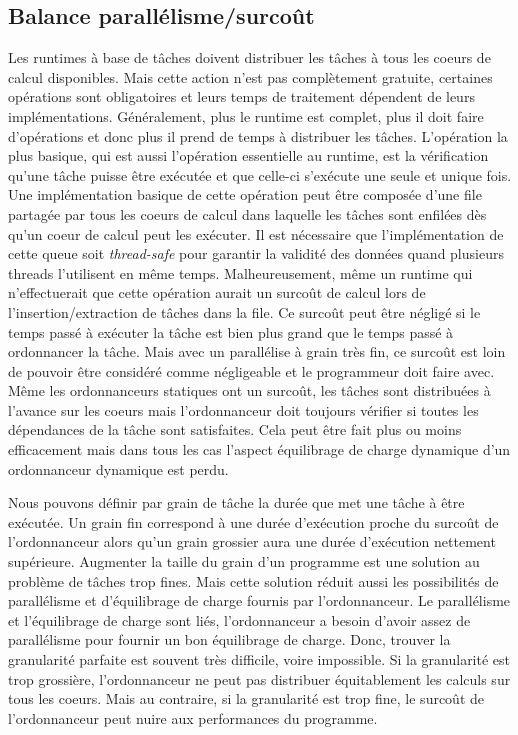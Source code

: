 \subsection{Balance parallélisme/surcoût}
Les runtimes à base de tâches doivent distribuer les tâches à tous les coeurs de calcul disponibles.
%
Mais cette action n'est pas complètement gratuite, certaines opérations sont obligatoires et leurs temps de traitement dépendent de leurs implémentations.
%
Généralement, plus le runtime est complet, plus il doit faire d'opérations et donc plus il prend de temps à distribuer les tâches.
%
L'opération la plus basique, qui est aussi l'opération essentielle au runtime, est la vérification qu'une tâche puisse être exécutée et que celle-ci s'exécute une seule et unique fois.
%
Une implémentation basique de cette opération peut être composée d'une file partagée par tous les coeurs de calcul dans laquelle les tâches sont enfilées dès qu'un coeur de calcul peut les exécuter.
%
Il est nécessaire que l'implémentation de cette queue soit {\em thread-safe} pour garantir la validité des données quand plusieurs threads l'utilisent en même temps.
%
Malheureusement, même un runtime qui n'effectuerait que cette opération aurait un surcoût de calcul lors de l'insertion/extraction de tâches dans la file.
%
Ce surcoût peut être négligé si le temps passé à exécuter la tâche est bien plus grand que le temps passé à ordonnancer la tâche.
%
Mais avec un parallélise à grain très fin, ce surcoût est loin de pouvoir être considéré comme négligeable et le programmeur doit faire avec.
%
Même les ordonnanceurs statiques ont un surcoût, les tâches sont distribuées à l'avance sur les coeurs mais l'ordonnanceur doit toujours vérifier si toutes les dépendances de la tâche sont satisfaites.
%
Cela peut être fait plus ou moins efficacement mais dans tous les cas l'aspect équilibrage de charge dynamique d'un ordonnanceur dynamique est perdu\cite{static_sched}.


Nous pouvons définir par grain de tâche la durée que met une tâche à être exécutée.
%
Un grain fin correspond à une durée d'exécution proche du surcoût de l'ordonnanceur alors qu'un grain grossier aura une durée d'exécution nettement supérieure.
%
Augmenter la taille du grain d'un programme est une solution au problème de tâches trop fines.
%
Mais cette solution réduit aussi les possibilités de parallélisme et d'équilibrage de charge fournis par l'ordonnanceur.
%
Le parallélisme et l'équilibrage de charge sont liés, l'ordonnanceur a besoin d'avoir assez de parallélisme pour fournir un bon équilibrage de charge.
%
Donc, trouver la granularité parfaite est souvent très difficile, voire impossible.
%
Si la granularité est trop grossière, l'ordonnanceur ne peut pas distribuer équitablement les calculs sur tous les coeurs.
%
Mais au contraire, si la granularité est trop fine, le surcoût de l'ordonnanceur peut nuire aux performances du programme.



